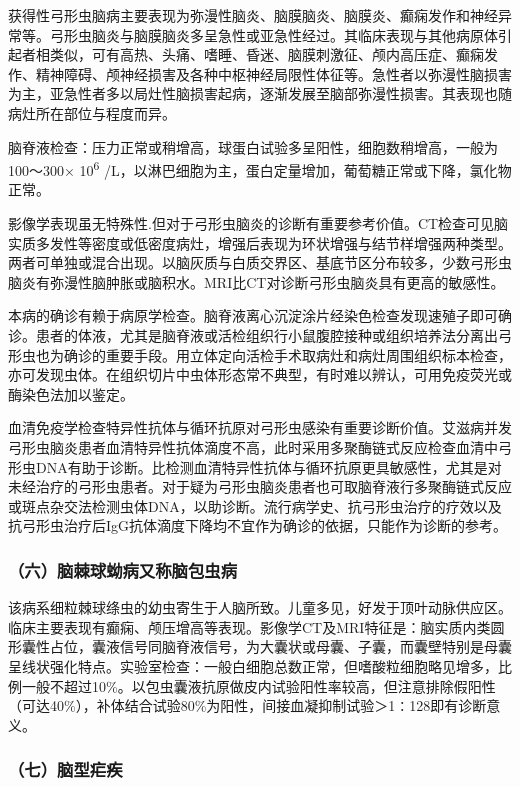 获得性弓形虫脑病主要表现为弥漫性脑炎、脑膜脑炎、脑膜炎、癫痫发作和神经异常等。弓形虫脑炎与脑膜脑炎多呈急性或亚急性经过。其临床表现与其他病原体引起者相类似，可有高热、头痛、嗜睡、昏迷、脑膜刺激征、颅内高压症、癫痫发作、精神障碍、颅神经损害及各种中枢神经局限性体征等。急性者以弥漫性脑损害为主，亚急性者多以局灶性脑损害起病，逐渐发展至脑部弥漫性损害。其表现也随病灶所在部位与程度而异。

脑脊液检查：压力正常或稍增高，球蛋白试验多呈阳性，细胞数稍增高，一般为100～300×
10\textsuperscript{6}
/L，以淋巴细胞为主，蛋白定量增加，葡萄糖正常或下降，氯化物正常。

影像学表现虽无特殊性.但对于弓形虫脑炎的诊断有重要参考价值。CT检查可见脑实质多发性等密度或低密度病灶，增强后表现为环状增强与结节样增强两种类型。两者可单独或混合出现。以脑灰质与白质交界区、基底节区分布较多，少数弓形虫脑炎有弥漫性脑肿胀或脑积水。MRI比CT对诊断弓形虫脑炎具有更高的敏感性。

本病的确诊有赖于病原学检查。脑脊液离心沉淀涂片经染色检查发现速殖子即可确诊。患者的体液，尤其是脑脊液或活检组织行小鼠腹腔接种或组织培养法分离出弓形虫也为确诊的重要手段。用立体定向活检手术取病灶和病灶周围组织标本检查，亦可发现虫体。在组织切片中虫体形态常不典型，有时难以辨认，可用免疫荧光或酶染色法加以鉴定。

血清免疫学检查特异性抗体与循环抗原对弓形虫感染有重要诊断价值。艾滋病并发弓形虫脑炎患者血清特异性抗体滴度不高，此时采用多聚酶链式反应检查血清中弓形虫DNA有助于诊断。比检测血清特异性抗体与循环抗原更具敏感性，尤其是对未经治疗的弓形虫患者。对于疑为弓形虫脑炎患者也可取脑脊液行多聚酶链式反应或斑点杂交法检测虫体DNA，以助诊断。流行病学史、抗弓形虫治疗的疗效以及抗弓形虫治疗后IgG抗体滴度下降均不宜作为确诊的依据，只能作为诊断的参考。

\subsubsection{（六）脑棘球蚴病又称脑包虫病}

该病系细粒棘球绦虫的幼虫寄生于人脑所致。儿童多见，好发于顶叶动脉供应区。临床主要表现有癫痫、颅压增高等表现。影像学CT及MRI特征是：脑实质内类圆形囊性占位，囊液信号同脑脊液信号，为大囊状或母囊、子囊，而囊壁特别是母囊呈线状强化特点。实验室检查：一般白细胞总数正常，但嗜酸粒细胞略见增多，比例一般不超过10\%。以包虫囊液抗原做皮内试验阳性率较高，但注意排除假阳性（可达40\%），补体结合试验80\%为阳性，间接血凝抑制试验＞1∶128即有诊断意义。

\subsubsection{（七）脑型疟疾}

